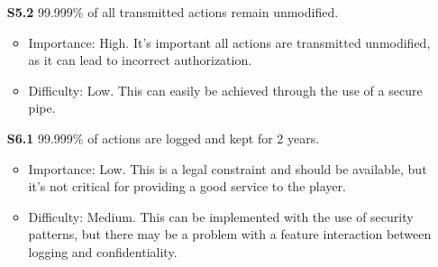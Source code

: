 \documentclass[a4paper,11pt]{report}
\begin{document}
\begin{itemize}
\begin{itemize}
\end{itemize}
\item[\textbf{S5.2}] 99.999\% of all transmitted actions remain unmodified.
\begin{itemize}
\item Importance: High. It's important all actions are transmitted unmodified, as it can lead to incorrect authorization.
\item Difficulty: Low. This can easily be achieved through the use of a secure pipe.
\end{itemize}
\item[\textbf{S6.1}] 99.999\% of actions are logged and kept for 2 years.
\begin{itemize}
\item Importance: Low. This is a legal constraint and should be available, but it's not critical for providing a good service to the player. 
\item Difficulty: Medium. This can be implemented with the use of security patterns, but there may be a problem with a feature interaction between logging and confidentiality.
\end{itemize}
\end{itemize}
\end{document}
